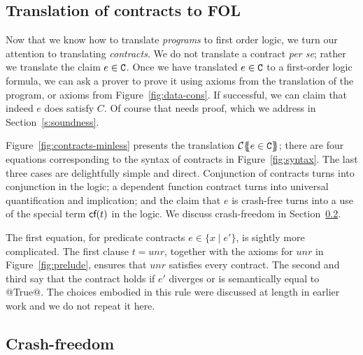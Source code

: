 
\subsection{Translation of contracts to FOL} \label{s:contracts-fol}

Now that we know how to translate \emph{programs} to first order
logic, we turn our attention to translating \emph{contracts}.  We do
not translate a contract \emph{per se}; rather we translate the claim
$e \in {\tt C}$.  Once we have translated $e \in {\tt C}$ to a first-order logic
formula, we can ask a prover to prove it using axioms from the translation of
the program, or axioms from Figure~\ref{fig:data-cons}. If successful, we can
claim that indeed $e$ does satisfy $C$.  Of course that needs proof,
which we address in Section~\ref{s:soundness}.

Figure~\ref{fig:contracts-minless} presents the translation
${\cal C}\{\!\!\{e \in {\tt C}\}\!\!\}$; there are four equations corresponding
to the syntax of contracts in Figure~\ref{fig:syntax}.
The last three cases are delightfully simple and direct.  Conjunction of contracts
turns into conjunction in the logic; a dependent function contract turns
into universal quantification and implication; and the claim that $e$ is
crash-free turns into a use of the special term $\textsf{cf}(t)$ in the logic.
We discuss crash-freedom in Section~\ref{s:cf-fol}.

The first equation, for predicate contracts $e \in \{x \mid e' \}$,
is sightly more complicated.
The first clause $t=unr$, together with the axioms for $unr$ in Figure~\ref{fig:prelude}, ensures
that $unr$ satisfies every contract.
The second and third say that the contract holds if $e'$ diverges or is semantically
equal to @True@.  The choices embodied in this rule were discussed at length
in earlier work \cite{xu+:contracts} and we do not repeat it here.

\subsection{Crash-freedom} \label{s:cf-fol}

